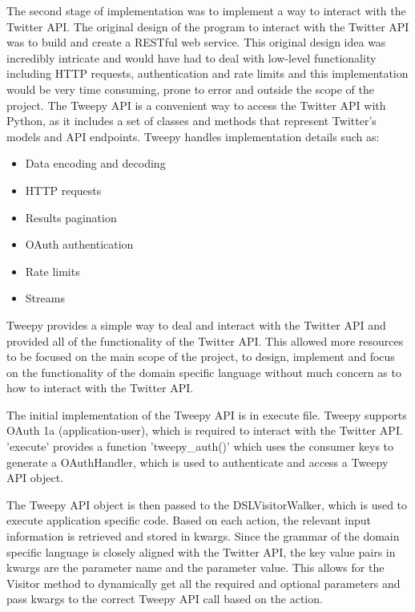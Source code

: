 The second stage of implementation was to implement a way to interact with the Twitter API. The original design of the program to interact with the Twitter API was to build and create a RESTful web service. This original design idea was incredibly intricate and would have had to deal with low-level functionality including HTTP requests, authentication and rate limits and this implementation would be very time consuming, prone to error and outside the scope of the project. The Tweepy API is a convenient way to access the Twitter API with Python, as it includes a set of classes and methods that represent Twitter's models and API endpoints. Tweepy handles implementation details such as:
\begin{itemize}
    \item Data encoding and decoding
    \item HTTP requests
    \item Results pagination
    \item OAuth authentication
    \item Rate limits
    \item Streams
\end{itemize}
Tweepy provides a simple way to deal and interact with the Twitter API and provided all of the functionality of the Twitter API. This allowed more resources to be focused on the main scope of the project, to design, implement and focus on the functionality of the domain specific language without much concern as to how to interact with the Twitter API. \newline \par

The initial implementation of the Tweepy API is in execute file. Tweepy supports OAuth 1a (application-user), which is required to interact with the Twitter API. 'execute' provides a function 'tweepy\_auth()' which uses the consumer keys to generate a OAuthHandler, which is used to authenticate and access a Tweepy API object. \newline \par

The Tweepy API object is then passed to the DSLVisitorWalker, which is used to execute application specific code. Based on each action, the relevant input information is retrieved and stored in kwargs. Since the grammar of the domain specific language is closely aligned with the Twitter API, the key value pairs in kwargs are the parameter name and the parameter value. This allows for the Visitor method to dynamically get all the required and optional parameters and pass kwargs to the correct Tweepy API call based on the action.

